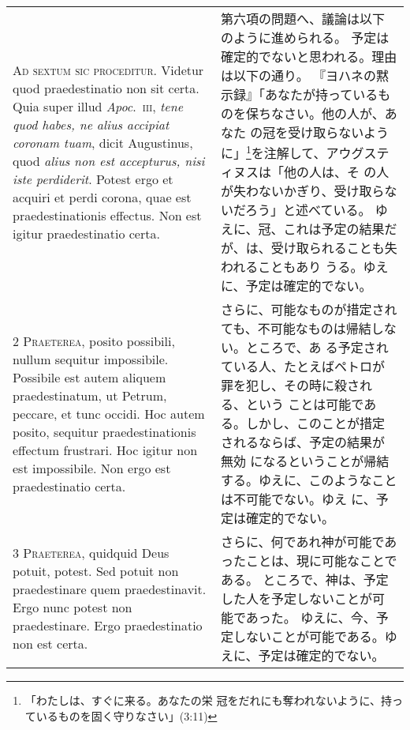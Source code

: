 \documentclass[10pt]{jsarticle} %
\begin{document}
\begin{longtable}{p{21em}p{21em}}



{\Huge A}{\scshape d sextum sic proceditur}. Videtur quod
praedestinatio non sit certa. Quia super illud {\itshape Apoc}.~{\scshape iii}, {\itshape tene quod
habes, ne alius accipiat coronam tuam}, dicit Augustinus, quod {\itshape alius non
est accepturus, nisi iste perdiderit}. Potest ergo et acquiri et perdi
corona, quae est praedestinationis effectus. Non est igitur
praedestinatio certa.


&

第六項の問題へ、議論は以下のように進められる。
予定は確定的でないと思われる。理由は以下の通り。
『ヨハネの黙示録』「あなたが持っているものを保ちなさい。他の人が、あなた
 の冠を受け取らないように」\footnote{「わたしは、すぐに来る。あなたの栄
 冠をだれにも奪われないように、持っているものを固く守りなさい」(3:11)}を注解して、アウグスティヌスは「他の人は、そ
 の人が失わないかぎり、受け取らないだろう」と述べている。
ゆえに、冠、これは予定の結果だが、は、受け取られることも失われることもあり
 うる。ゆえに、予定は確定的でない。


\\


{\scshape 2 Praeterea}, posito possibili, nullum
sequitur impossibile. Possibile est autem aliquem praedestinatum, ut
Petrum, peccare, et tunc occidi. Hoc autem posito, sequitur
praedestinationis effectum frustrari. Hoc igitur non est
impossibile. Non ergo est praedestinatio certa.


&


さらに、可能なものが措定されても、不可能なものは帰結しない。ところで、あ
 る予定されている人、たとえばペトロが罪を犯し、その時に殺される、という
 ことは可能である。しかし、このことが措定されるならば、予定の結果が無効
 になるということが帰結する。ゆえに、このようなことは不可能でない。ゆえ
 に、予定は確定的でない。

\\


{\scshape 3 Praeterea}, quidquid Deus potuit,
potest. Sed potuit non praedestinare quem praedestinavit. Ergo nunc
potest non praedestinare. Ergo praedestinatio non est certa.


&

さらに、何であれ神が可能であったことは、現に可能なことである。
ところで、神は、予定した人を予定しないことが可能であった。
ゆえに、今、予定しないことが可能である。ゆえに、予定は確定的でない。

\\



\end{longtable}
\end{document}
